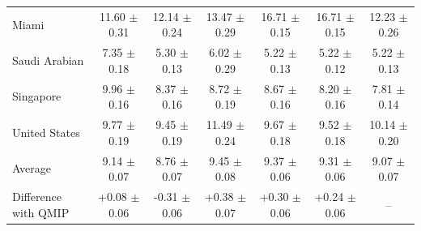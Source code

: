 \begin{tabular}{lcccccc}
Miami & 11.60 $\pm$ 0.31 & 12.14 $\pm$ 0.24 & 13.47 $\pm$ 0.29 & 16.71 $\pm$ 0.15 & 16.71 $\pm$ 0.15 & 12.23 $\pm$ 0.26 \\
Saudi Arabian & 7.35 $\pm$ 0.18 & 5.30 $\pm$ 0.13 & 6.02 $\pm$ 0.29 & 5.22 $\pm$ 0.13 & 5.22 $\pm$ 0.12 & 5.22 $\pm$ 0.13 \\
Singapore & 9.96 $\pm$ 0.16 & 8.37 $\pm$ 0.16 & 8.72 $\pm$ 0.19 & 8.67 $\pm$ 0.16 & 8.20 $\pm$ 0.16 & 7.81 $\pm$ 0.14 \\
United States & 9.77 $\pm$ 0.19 & 9.45 $\pm$ 0.19 & 11.49 $\pm$ 0.24 & 9.67 $\pm$ 0.18 & 9.52 $\pm$ 0.18 & 10.14 $\pm$ 0.20 \\
\midrule
Average & 9.14 $\pm$ 0.07 & 8.76 $\pm$ 0.07 & 9.45 $\pm$ 0.08 & 9.37 $\pm$ 0.06 & 9.31 $\pm$ 0.06 & 9.07 $\pm$ 0.07 \\
Difference with QMIP & +0.08 $\pm$ 0.06 & -0.31 $\pm$ 0.06 & +0.38 $\pm$ 0.07 & +0.30 $\pm$ 0.06 & +0.24 $\pm$ 0.06 & -- \\
\bottomrule
\end{tabular}
